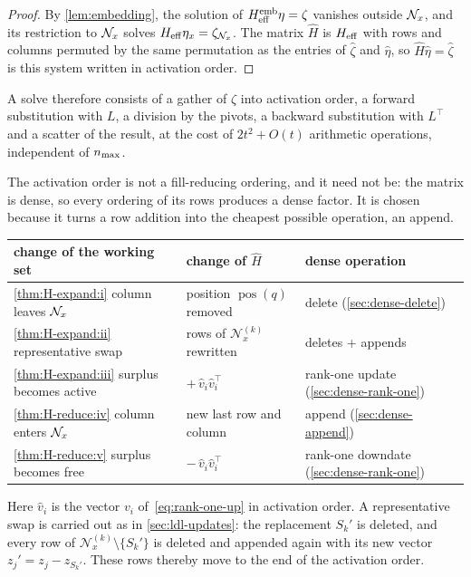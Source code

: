 \begin{proof}
By \cref{lem:embedding}, the solution of $H_{\mathrm{eff}}^{\mathrm{emb}}\eta = \zeta$ vanishes outside
$\mathcal{N}_x$, and its restriction to $\mathcal{N}_x$ solves $H_{\mathrm{eff}}\eta_x = \zeta_{\mathcal{N}_x}$. The matrix $\hat H$ is $H_{\mathrm{eff}}$
with rows and columns permuted by the same permutation as the entries of $\hat\zeta$ and
$\hat\eta$, so $\hat H\hat\eta = \hat\zeta$ is this system written in activation order.
\end{proof}

A solve therefore consists of a gather of $\zeta$ into activation order, a forward substitution
with $L$, a division by the pivots, a backward substitution with $L^\top$ and a scatter of the
result, at the cost of $2t^2 + O(t)$ arithmetic operations, independent of $n_{\max}$.

\medskip

The activation order is not a fill-reducing ordering, and it need not be: the matrix is dense,
so every ordering of its rows produces a dense factor. It is chosen because it turns a row
addition into the cheapest possible operation, an append.

\begin{center}
\renewcommand{\arraystretch}{1.25}
\begin{tabular}{lll}
\toprule
change of the working set & change of $\hat H$ & dense operation \\
\midrule
\ref{thm:H-expand:i} column leaves $\mathcal{N}_x$ & position $\operatorname{pos}(q)$ removed & delete (\cref{sec:dense-delete}) \\
\ref{thm:H-expand:ii} representative swap & rows of $\mathcal{N}_x^{(k)}$ rewritten & deletes + appends \\
\ref{thm:H-expand:iii} surplus becomes active & $+\,\hat v_i\hat v_i^\top$ & rank-one update (\cref{sec:dense-rank-one}) \\
\ref{thm:H-reduce:iv} column enters $\mathcal{N}_x$ & new last row and column & append (\cref{sec:dense-append}) \\
\ref{thm:H-reduce:v} surplus becomes free & $-\,\hat v_i\hat v_i^\top$ & rank-one downdate (\cref{sec:dense-rank-one}) \\
\bottomrule
\end{tabular}
\end{center}

Here $\hat v_i$ is the vector $v_i$ of~\eqref{eq:rank-one-up} in activation order. A
representative swap is carried out as in \cref{sec:ldl-updates}: the replacement $S_k'$ is
deleted, and every row of $\mathcal{N}_x^{(k)}\setminus\{S_k'\}$ is deleted and appended again with
its new vector $z_j' = z_j - z_{S_k'}$. These rows thereby move to the end of the activation order.


